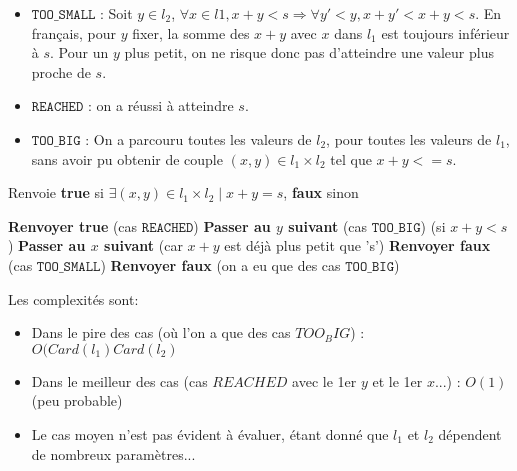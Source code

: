 \documentclass[10pt]{article}
\begin{document}
				\begin{itemize}[label=-]
					\setlength\itemsep{0.1em}
					\item $\mathtt{TOO\_SMALL}$ : Soit $y \in l_2$, $\forall x \in l1, x + y < s \Rightarrow \forall y' < y, x + y' < x + y < s$.
					En français, pour $y$ fixer, la somme des $x + y$ avec $x$ dans $l_1$ est toujours inférieur à $s$.
					Pour un $y$ plus petit, on ne risque donc pas d'atteindre une valeur plus proche de $s$.
					\item $\mathtt{REACHED}$ : on a réussi à atteindre $s$.
					\item $\mathtt{TOO\_BIG}$ : On a parcouru toutes les valeurs de $l_2$, pour toutes les valeurs de $l_1$,
					sans avoir pu obtenir de couple $(x, y) \in l_1 \times l_2$ tel que $x + y <= s$.
				\end{itemize}
				
				\begin{algorithm}
					\caption{Renvoie \textbf{true} si $\exists (x, y) \in l_1 \times l_2 \mid x + y = s$, \textbf{faux} sinon}
					\begin{algorithmic}[1]
										\State \textbf{Renvoyer true} (cas $\mathtt{REACHED}$)
										\State \textbf{Passer au $y$ suivant} (cas $\mathtt{TOO\_BIG}$)
									\Else (si $x + y < s$)
										\State \textbf{Passer au $x$ suivant} (car $x + y$ est déjà plus petit que 's')
									\EndIf
								\EndFor
								\State \textbf{Renvoyer faux} (cas $\mathtt{TOO\_SMALL}$)
							\EndFor
							\State \textbf{Renvoyer faux} (on a eu que des cas $\mathtt{TOO\_BIG}$)
						\EndFunction
					\end{algorithmic}
				\end{algorithm}
				
				Les complexités sont:
				\begin{itemize}[label=-]
					\setlength\itemsep{0.1em}
					\item Dans le pire des cas (où l'on a que des cas $TOO_BIG$) : $O(Card(l_1)Card(l_2)$
					\item Dans le meilleur des cas (cas $REACHED$ avec le 1er $y$ et le 1er $x$...) : $O(1)$ (peu probable)
					\item Le cas moyen n'est pas évident à évaluer, étant donné que $l_1$ et $l_2$ dépendent de nombreux paramètres...
				\end{itemize}
\end{document}
